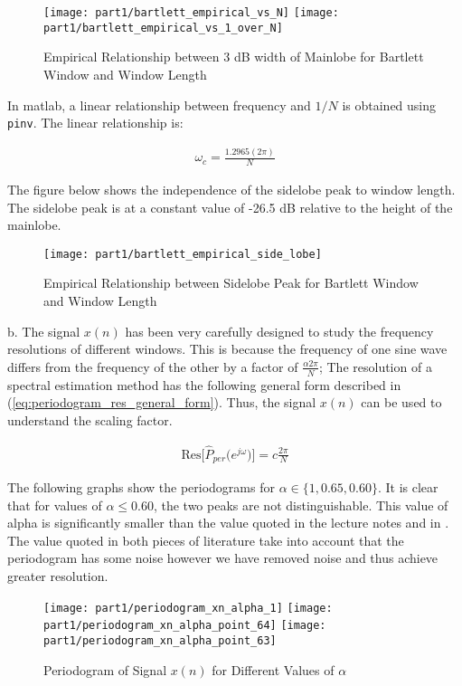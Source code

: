 \begin{figure}[H]
\centering{}
\texttt{[image: part1/bartlett\_empirical\_vs\_N]}
\texttt{[image: part1/bartlett\_empirical\_vs\_1\_over\_N]}
\caption{Empirical Relationship between 3 dB width of Mainlobe for Bartlett Window and Window Length}
\end{figure}

\noindent{}In matlab, a linear relationship between frequency and $1/N$ is obtained using \texttt{pinv}. The linear relationship is:

\begin{align*}
\omega_{c}=\frac{1.2965(2\pi)}{N}
\end{align*}


\noindent{}The figure below shows the independence of the sidelobe peak to window length. The sidelobe peak is at a constant value of -26.5 dB relative to the height of the mainlobe.

\begin{figure}[H]
\centering{}
\texttt{[image: part1/bartlett\_empirical\_side\_lobe]}
\caption{Empirical Relationship between Sidelobe Peak for Bartlett Window and Window Length}
\end{figure}

\noindent{}b. The signal $x(n)$ has been very carefully designed to study the frequency resolutions of different windows. This is because the frequency of one sine wave differs from the frequency of the other by a factor of $\frac{\alpha 2\pi}{N}$; The resolution of a spectral estimation method has the following general form described in (\ref{eq:periodogram_res_general_form}). Thus, the signal $x(n)$ can be used to understand the scaling factor.

\begin{align}
\text{Res}\Bigg[\hat{P}_{per}\bigg(e^{j\omega}\bigg)\Bigg] = c\frac{2\pi}{N} \label{eq:periodogram_res_general_form}
\end{align}

\noindent{}The following graphs show the periodograms for $\alpha \in \{1, 0.65, 0.60\}$. It is clear that for values of $\alpha \leq 0.60$, the two peaks are not distinguishable. This value of alpha is significantly smaller than the value quoted in the lecture notes and in \cite{hayes2009statistical}. The value quoted in both pieces of literature take into account that the periodogram has some noise however we have removed noise and thus achieve greater resolution. 

\begin{figure}[H]
\centering{}
\texttt{[image: part1/periodogram\_xn\_alpha\_1]}
\texttt{[image: part1/periodogram\_xn\_alpha\_point\_64]}
\texttt{[image: part1/periodogram\_xn\_alpha\_point\_63]}
\caption{Periodogram of Signal $x(n)$ for Different Values of $\alpha$}
\end{figure}

